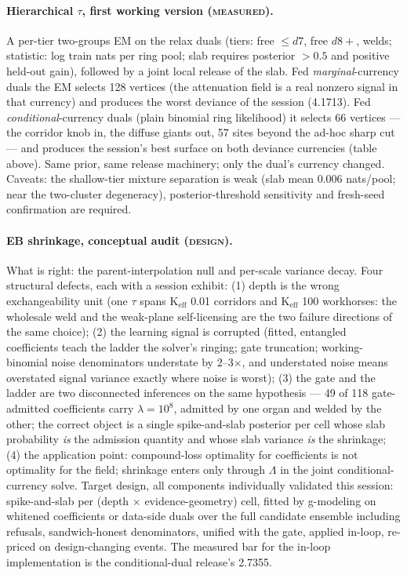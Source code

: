 \paragraph{Hierarchical $\tau$, first working version (\textsc{measured}).}
A per-tier two-groups EM on the relax duals (tiers: free $\le d7$, free
$d8{+}$, welds; statistic: log train nats per ring pool; slab requires
posterior $>0.5$ and positive held-out gain), followed by a joint local
release of the slab. Fed \emph{marginal}-currency duals the EM selects 128
vertices (the attenuation field is a real nonzero signal in that currency)
and produces the worst deviance of the session (4.1713). Fed
\emph{conditional}-currency duals (plain binomial ring likelihood) it selects
66 vertices --- the corridor knob in, the diffuse giants out, 57 sites beyond
the ad-hoc sharp cut --- and produces the session's best surface on both
deviance currencies (table above). Same prior, same release machinery; only
the dual's currency changed. Caveats: the shallow-tier mixture separation is
weak (slab mean 0.006 nats/pool; near the two-cluster degeneracy),
posterior-threshold sensitivity and fresh-seed confirmation are required.

\paragraph{EB shrinkage, conceptual audit (\textsc{design}).} What is right:
the parent-interpolation null and per-scale variance decay. Four structural
defects, each with a session exhibit: (1) depth is the wrong exchangeability
unit (one $\tau$ spans K$_{\mathrm{eff}}$ 0.01 corridors and K$_{\mathrm{eff}}$
100 workhorses: the wholesale weld and the weak-plane self-licensing are the
two failure directions of the same choice); (2) the learning signal is
corrupted (fitted, entangled coefficients teach the ladder the solver's
ringing; gate truncation; working-binomial noise denominators understate by
2--3$\times$, and understated noise means overstated signal variance exactly
where noise is worst); (3) the gate and the ladder are two disconnected
inferences on the same hypothesis --- 49 of 118 gate-admitted coefficients
carry $\lambda=10^8$, admitted by one organ and welded by the other; the
correct object is a single spike-and-slab posterior per cell whose slab
probability \emph{is} the admission quantity and whose slab variance
\emph{is} the shrinkage; (4) the application point: compound-loss optimality
for coefficients is not optimality for the field; shrinkage enters only
through $\Lambda$ in the joint conditional-currency solve. Target design, all
components individually validated this session: spike-and-slab per
(depth $\times$ evidence-geometry) cell, fitted by g-modeling on whitened
coefficients or data-side duals over the full candidate ensemble including
refusals, sandwich-honest denominators, unified with the gate, applied
in-loop, re-priced on design-changing events. The measured bar for the
in-loop implementation is the conditional-dual release's 2.7355.


